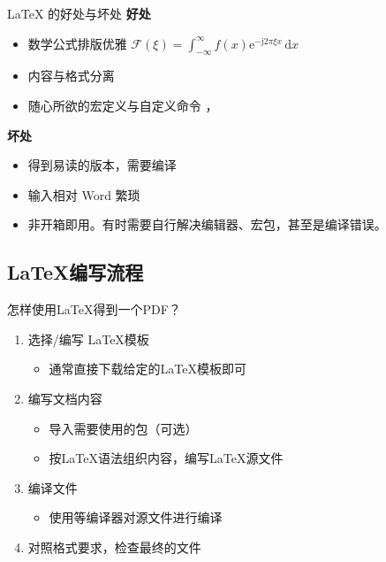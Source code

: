 \begin{frame}[fragile]{\LaTeX{} 的好处与坏处}
    \textbf{好处}
    \begin{itemize}
        \item 数学公式排版优雅 \quad $\mathcal{F}(\xi)=\int_{-\infty}^{\infty} f(x)\mathrm{e}^{-\mathrm{j}2\pi \xi x}\,\mathrm{d}x$
        \item 内容与格式分离
        \item 随心所欲的宏定义与自定义命令 ，
    \end{itemize}

    \vspace{2em}
    \textbf{坏处}
    \begin{itemize}
        \item 得到易读的版本，需要编译
        \item 输入相对 Word 繁琐
        \item 非开箱即用。有时需要自行解决编辑器、宏包，甚至是编译错误。
    \end{itemize}
\end{frame}

\subsection{\LaTeX{}编写流程}
\begin{frame}[fragile]{怎样使用\LaTeX{}得到一个PDF？}
	\begin{enumerate}
		\item 选择/编写 \LaTeX{}模板
		      \begin{itemize}
			      \item 通常直接下载给定的\LaTeX{}模板即可
		      \end{itemize}
		\item 编写文档内容
		      \begin{itemize}
			      \item 导入需要使用的包（可选）
			      \item 按\LaTeX{}语法组织内容，编写\LaTeX{}源文件
		      \end{itemize}
		\item 编译文件
		      \begin{itemize}
			      \item 使用\XeLaTeX{}等编译器对源文件进行编译
		      \end{itemize}
    \item \alert{对照格式要求，检查最终的文件}
	\end{enumerate}
\end{frame}
